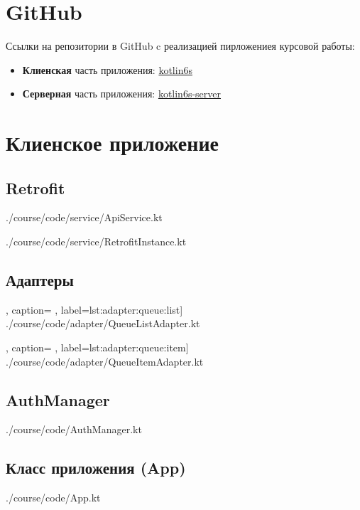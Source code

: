 \chapter{GitHub}
Ссылки на репозитории в GitHub c реализацией пирложениея курсовой работы:

\begin{itemize}
	\item \textbf{Клиенская} часть приложения:
		\href{https://github.com/AndB0ndar/kotlin6s}{kotlin6s}
	\item \textbf{Серверная} часть приложения:
		\href{https://github.com/AndB0ndar/kotlin6s-server}{kotlin6s-server}
\end{itemize}

\chapter{Клиенское приложение}

\section{Retrofit}\label{lst:retrofit}

{./course/code/service/ApiService.kt}

{./course/code/service/RetrofitInstance.kt}

\section{Адаптеры}

	, caption=
	, label={lst:adapter:queue:list}]
{./course/code/adapter/QueueListAdapter.kt}

	, caption=
	, label={lst:adapter:queue:item}]
{./course/code/adapter/QueueItemAdapter.kt}

\section{AuthManager}\label{lst:auth:manager}

{./course/code/AuthManager.kt}

\section{Класс приложения (App)}\label{lst:app}

{./course/code/App.kt}

